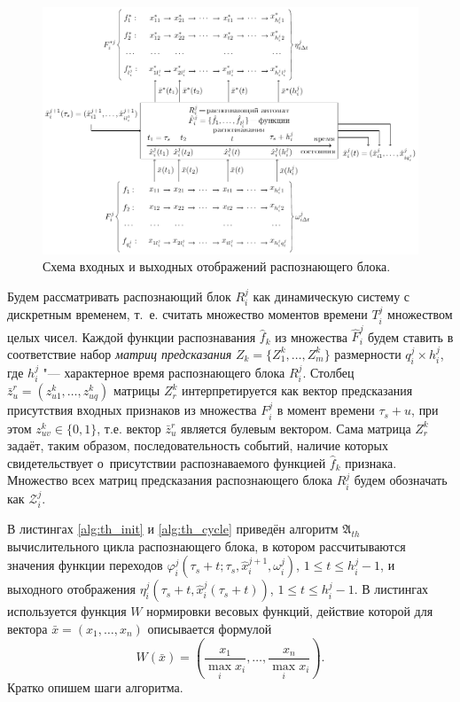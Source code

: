 \documentclass[a4paper, 12pt]{article}
\theoremstyle{plain}
\begin{document}
	\begin{figure}[h]
		\includegraphics[width=\linewidth]{rb_io}
		\caption{Схема входных и выходных отображений распознающего блока.}
		\label{fig:rb_io}
	\end{figure}
	
	Будем рассматривать распознающий блок $R_i^j$ как динамическую систему с дискретным временем, т.~е. считать множество моментов времени $T_i^j$ множеством целых чисел. Каждой функции распознавания $\hat{f}_k$ из множества $\hat{F}_i^j$ будем ставить в соответствие набор \textit{матриц предсказания} $Z_k=\{Z_1^k,…,Z_m^k\}$ размерности $q_i^j\times h_i^j$, где $h_i^j$ "--- характерное время распознающего блока $R_i^j$. Столбец $\bar{z}_u^r=(z_{u1}^k,…,z_{uq}^k)$ матрицы $Z_r^k$ интерпретируется как вектор предсказания присутствия входных признаков из множества $F_i^j$ в момент времени $\tau_s+u$, при этом $z_{uv}^k\in\{0,1\}$, т.е. вектор $\bar{z}_u^r$ является булевым вектором. Сама матрица $Z_r^k$ задаёт, таким образом, последовательность событий, наличие которых свидетельствует о~присутствии распознаваемого функцией $\hat{f}_k$ признака. Множество всех матриц предсказания распознающего блока $R_i^j$ будем обозначать как $\mathcal{Z}_i^j$.
	
	В листингах \ref{alg:th_init} и \ref{alg:th_cycle} приведён алгоритм $\mathfrak{A}_{th}$ вычислительного цикла распознающего блока, в котором рассчитываются значения функции переходов $\varphi_i^j(\tau_s+t;\tau_s,\hat{x}_i^{j+1},\omega_i^j)$, $1\leqslant{t}\leqslant h_i^j-1$, и выходного отображения $\eta_i^j(\tau_s+t,\hat{x}_i^j(\tau_s+t))$, $1\leqslant{t}\leqslant h_i^j-1$. В листингах используется функция $W$ нормировки весовых функций, действие которой для вектора $\bar x=(x_1,\dots,x_n)$ описывается формулой
	\[
		W(\bar x)=\left(\frac{x_1}{\max\limits_i x_i},\dots,\frac{x_n}{\max\limits_i x_i}\right).
	\] 
	Кратко опишем шаги алгоритма.
	
\end{document}
